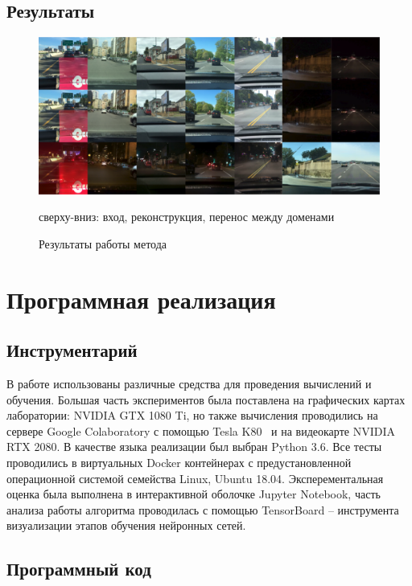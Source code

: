 \documentclass[11pt,a4paper]{extarticle}
\begin{document}
{	\subsection{Результаты}\label{sec:results}
		\begin{figure}[ht]
			\centering
			\includegraphics[width=\textwidth]{img/results}
			\caption{Результаты работы метода}{
				\small{
					сверху-вниз: вход, реконструкция, перенос между доменами
				}
			}
			\label{pic:results}
		\end{figure}

\newpage
\section{Программная реализация}\label{sec:prac}

	\subsection{Инструментарий}\label{sec:tools}

		В работе использованы различные средства для проведения вычислений и обучения.
		Большая часть экспериментов была поставлена на графических картах лаборатории: NVIDIA GTX 1080 Ti, но также вычисления проводились на сервере Google Colaboratory с помощью Tesla K80~\cite{colab} и на видеокарте NVIDIA RTX 2080.
		В качестве языка реализации был выбран Python 3.6.
		Все тесты проводились в виртуальных Docker контейнерах с предустановленной операционной системой семейства Linux, Ubuntu 18.04.
		Эксперементальная оценка была выполнена в интерактивной оболочке Jupyter Notebook, часть анализа работы алгоритма проводилась с помощью TensorBoard -- инструмента визуализации этапов обучения нейронных сетей.

	\subsection{Программный код}\label{sec:code}

}
\end{document}
